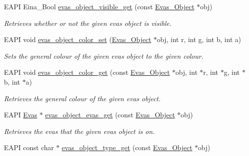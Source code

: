 \begin{DoxyCompactItemize}
EAPI Eina\_\-Bool \hyperlink{group__Evas__Object__Group__Basic_ga9cf743b5d87b622c84ba591494445b49}{evas\_\-object\_\-visible\_\-get} (const \hyperlink{group__Evas__Object__Group_ga9e19e6dd1f517a0ba437c0114d3e7c97}{Evas\_\-Object} $\ast$obj)
\begin{DoxyCompactList}\small\item\em Retrieves whether or not the given evas object is visible. \item\end{DoxyCompactList}\item 
EAPI void \hyperlink{group__Evas__Object__Group__Basic_ga6b2dfe01eb955cebf734f4e10ac9ce7f}{evas\_\-object\_\-color\_\-set} (\hyperlink{group__Evas__Object__Group_ga9e19e6dd1f517a0ba437c0114d3e7c97}{Evas\_\-Object} $\ast$obj, int r, int g, int b, int a)
\begin{DoxyCompactList}\small\item\em Sets the general colour of the given evas object to the given colour. \item\end{DoxyCompactList}\item 
EAPI void \hyperlink{group__Evas__Object__Group__Basic_ga3856f8b88d158ffa9783b44340ef343d}{evas\_\-object\_\-color\_\-get} (const \hyperlink{group__Evas__Object__Group_ga9e19e6dd1f517a0ba437c0114d3e7c97}{Evas\_\-Object} $\ast$obj, int $\ast$r, int $\ast$g, int $\ast$b, int $\ast$a)
\begin{DoxyCompactList}\small\item\em Retrieves the general colour of the given evas object. \item\end{DoxyCompactList}\item 
EAPI \hyperlink{group__Evas__Canvas_ga5ff87cc4ce6bc43e3b640a6d37f73043}{Evas} $\ast$ \hyperlink{group__Evas__Object__Group__Basic_ga678e810edc3e2ee8b1080186bfa12247}{evas\_\-object\_\-evas\_\-get} (const \hyperlink{group__Evas__Object__Group_ga9e19e6dd1f517a0ba437c0114d3e7c97}{Evas\_\-Object} $\ast$obj)
\begin{DoxyCompactList}\small\item\em Retrieves the evas that the given evas object is on. \item\end{DoxyCompactList}\item 
EAPI const char $\ast$ \hyperlink{group__Evas__Object__Group__Basic_gaebc12590e689bfcbfede10eca37f80ff}{evas\_\-object\_\-type\_\-get} (const \hyperlink{group__Evas__Object__Group_ga9e19e6dd1f517a0ba437c0114d3e7c97}{Evas\_\-Object} $\ast$obj)

\end{DoxyCompactItemize}
